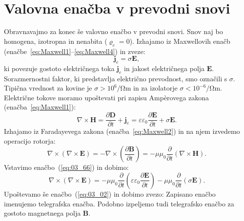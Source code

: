 \section{Valovna enačba v prevodni snovi}
\label{section:35}
Obravnavajmo za konec še valovno enačbo v prevodni snovi. Snov naj
bo homogena, izotropna in nenabita ($\varrho_e = 0$). Izhajamo
iz Maxwellovih enačb (enačbe~\ref{eq:Maxwell1}--\ref{eq:Maxwell4}) in zveze:
\begin{equation}
\mathbf{j}_e = \sigma \mathbf{E},
\label{eq:03_65}
\end{equation}
ki povezuje gostoto električnega toka $\mathbf{j}_e $ in jakost 
električnega polja $\mathbf{E}$. Sorazmernostni faktor, ki predstavlja
električno prevodnost, smo označili s $\sigma$. Tipična vrednost
za kovine je $\sigma > 10^6/\si{\ohm\m}$ in za izolatorje 
$\sigma < 10^{-6}/\si{\ohm\m}$. 
Električne tokove moramo upoštevati pri zapisu Amp\`{e}rovega zakona 
(enačba~\ref{eq:Maxwell1}):
\begin{equation}
\nabla\times\mathbf{H} =\frac{\partial\mathbf{D}}{\partial t}+\mathbf{j}_e = 
\varepsilon \varepsilon_0 \frac{\partial\mathbf{E}}{\partial t}+\sigma \mathbf{E}.
\label{eq:03_66}
\end{equation}
Izhajamo iz Faradayevega zakona (enačba~\ref{eq:Maxwell2}) in na njem izvedemo operacijo rotorja:
\begin{equation}
\nabla \times \left( \nabla \times  \mathbf{E}\right) = -\nabla\times \left(
\frac{\partial \mathbf{B}}{\partial t}\right) = - \mu \mu_0 \frac{\partial }{\partial t}
\left( \nabla \times \mathbf{H}\right)\!\!.
\label{eq:03_67}
\end{equation}
Vstavimo enačbo~(\ref{eq:03_66}) in dobimo:
\begin{equation}
\nabla \times \left( \nabla \times  \mathbf{E}\right) =
 -\mu \mu_0 \frac{\partial }{\partial t}
\left( \varepsilon \varepsilon_0 \frac{\partial\mathbf{E}}{\partial t}\right)-
\mu \mu_0 \frac{\partial }{\partial t}\left(\sigma \mathbf{E} \right)\!\!.
\label{eq:03_671}
\end{equation}
Upoštevamo še enačbo~(\ref{eq:03_02}) in dobimo zvezo:
Zapisano enačbo imenujemo telegrafska enačba. Podobno izpeljemo tudi telegrafsko enačbo
za gostoto magnetnega polja $\mathbf{B}$.

